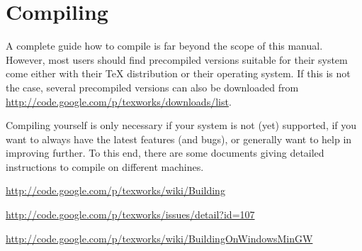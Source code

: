 
\chapter{Compiling {\Tw}}
\label{sec.compiling}

A complete guide how to compile {\Tw} is far beyond the scope of this manual. However, most users should find precompiled versions suitable for their system come either with their {\TeX} distribution or their operating system. If this is not the case, several precompiled versions can also be downloaded from \url{http://code.google.com/p/texworks/downloads/list}.

Compiling {\Tw} yourself is only necessary if your system is not (yet) supported, if you want to always have the latest features (and bugs), or generally want to help in improving {\Tw} further. To this end, there are some documents giving detailed instructions to compile {\Tw} on different machines.

\begin{OSLinux}
\noindent\url{http://code.google.com/p/texworks/wiki/Building} \\
\end{OSLinux}

\begin{OSMac}
\noindent\url{http://code.google.com/p/texworks/issues/detail?id=107} \\
\end{OSMac}

\begin{OSWindows}
\noindent\url{http://code.google.com/p/texworks/wiki/BuildingOnWindowsMinGW} \\
\end{OSWindows}
